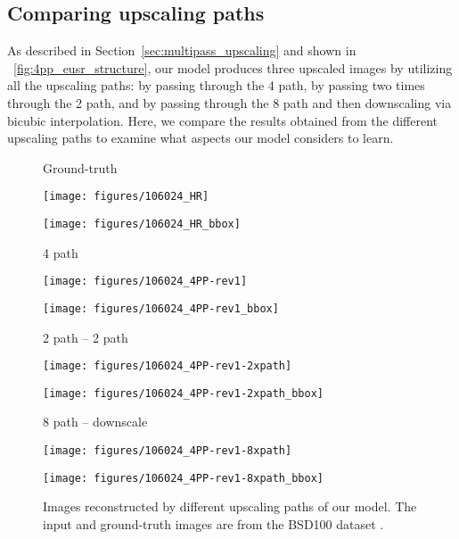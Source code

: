 \documentclass[runningheads]{llncs}
\begin{document}
\subsection{Comparing upscaling paths}
\label{sec:comparing_upscaling_paths}

As described in Section~\ref{sec:multipass_upscaling} and shown in \figurename~\ref{fig:4pp_eusr_structure}, our model produces three upscaled images by utilizing all the upscaling paths: by passing through the 4 path, by passing two times through the 2 path, and by passing through the 8 path and then downscaling via bicubic interpolation.
Here, we compare the results obtained from the different upscaling paths to examine what aspects our model considers to learn.


\begin{figure*}[t]
	\centering
	\begin{minipage}[b]{0.24\linewidth}
		\centering
		\centerline{\scriptsize{Ground-truth}}\medskip
		\centerline{\texttt{[image: figures/106024\_HR]}}\smallskip
		\centerline{\texttt{[image: figures/106024\_HR\_bbox]}}
	\end{minipage}
	\begin{minipage}[b]{0.24\linewidth}
		\centering
		\centerline{\scriptsize{4 path}}\medskip
		\centerline{\texttt{[image: figures/106024\_4PP-rev1]}}\smallskip
		\centerline{\texttt{[image: figures/106024\_4PP-rev1\_bbox]}}
	\end{minipage}
	\begin{minipage}[b]{0.24\linewidth}
		\centering
		\centerline{\scriptsize{2 path -- 2 path}}\medskip
		\centerline{\texttt{[image: figures/106024\_4PP-rev1-2xpath]}}\smallskip
		\centerline{\texttt{[image: figures/106024\_4PP-rev1-2xpath\_bbox]}}
	\end{minipage}
	\begin{minipage}[b]{0.24\linewidth}
		\centering
		\centerline{\scriptsize{8 path -- downscale}}\medskip
		\centerline{\texttt{[image: figures/106024\_4PP-rev1-8xpath]}}\smallskip
		\centerline{\texttt{[image: figures/106024\_4PP-rev1-8xpath\_bbox]}}
	\end{minipage}
	\caption{Images reconstructed by different upscaling paths of our model. The input and ground-truth images are from the BSD100 dataset \cite{martin2001database}.}
	\label{fig:result_upscale_path_comparison}
\end{figure*}
\end{document}
